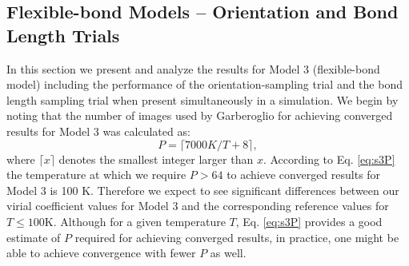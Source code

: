         \subsection{Flexible-bond Models -- Orientation and Bond Length Trials}
            In this section we present and analyze the results for Model 3 (flexible-bond model) including the performance of the orientation-sampling trial and the bond length sampling trial when present simultaneously in a simulation. We begin by noting that the number of images used by Garberoglio for achieving converged results \cite{Garberoglio2014} for Model 3 was calculated as:
            \begin{equation}
            \label{eq:s3P}
                P = \lceil 7000 K/T + 8 \rceil,
            \end{equation}
            where $\lceil x \rceil$ denotes the smallest integer larger than $x$.
According to Eq. \eqref{eq:s3P} the temperature at which we require $P > 64$ to achieve converged results for Model 3 is 100 K. Therefore we expect to see significant differences between our virial coefficient values for Model 3 and the corresponding reference values for $T \le 100 $K. Although for a given temperature $T$, Eq. \eqref{eq:s3P} provides a good estimate of $P$ required for achieving converged results, in practice, one might be able to achieve convergence with fewer $P$ as well.

